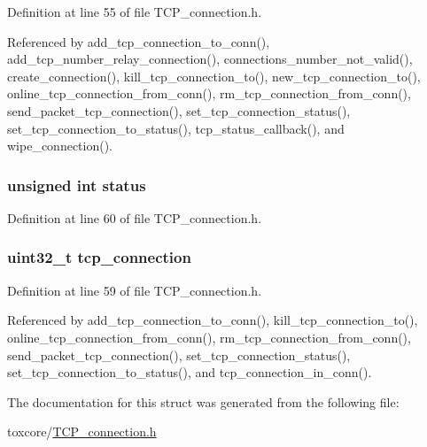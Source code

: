 Definition at line 55 of file T\+C\+P\+\_\+connection.\+h.



Referenced by add\+\_\+tcp\+\_\+connection\+\_\+to\+\_\+conn(), add\+\_\+tcp\+\_\+number\+\_\+relay\+\_\+connection(), connections\+\_\+number\+\_\+not\+\_\+valid(), create\+\_\+connection(), kill\+\_\+tcp\+\_\+connection\+\_\+to(), new\+\_\+tcp\+\_\+connection\+\_\+to(), online\+\_\+tcp\+\_\+connection\+\_\+from\+\_\+conn(), rm\+\_\+tcp\+\_\+connection\+\_\+from\+\_\+conn(), send\+\_\+packet\+\_\+tcp\+\_\+connection(), set\+\_\+tcp\+\_\+connection\+\_\+status(), set\+\_\+tcp\+\_\+connection\+\_\+to\+\_\+status(), tcp\+\_\+status\+\_\+callback(), and wipe\+\_\+connection().

\hypertarget{struct_t_c_p___connection__to_aeed08ea57af6f7be240e2bf66162389f}{
\subsubsection[{status}]{\setlength{\rightskip}{0pt plus 5cm}unsigned int status}}\label{struct_t_c_p___connection__to_aeed08ea57af6f7be240e2bf66162389f}


Definition at line 60 of file T\+C\+P\+\_\+connection.\+h.

\hypertarget{struct_t_c_p___connection__to_a36999f2346dd09dd7c3135fe135404ae}{
\subsubsection[{tcp\+\_\+connection}]{\setlength{\rightskip}{0pt plus 5cm}uint32\+\_\+t tcp\+\_\+connection}}\label{struct_t_c_p___connection__to_a36999f2346dd09dd7c3135fe135404ae}


Definition at line 59 of file T\+C\+P\+\_\+connection.\+h.



Referenced by add\+\_\+tcp\+\_\+connection\+\_\+to\+\_\+conn(), kill\+\_\+tcp\+\_\+connection\+\_\+to(), online\+\_\+tcp\+\_\+connection\+\_\+from\+\_\+conn(), rm\+\_\+tcp\+\_\+connection\+\_\+from\+\_\+conn(), send\+\_\+packet\+\_\+tcp\+\_\+connection(), set\+\_\+tcp\+\_\+connection\+\_\+status(), set\+\_\+tcp\+\_\+connection\+\_\+to\+\_\+status(), and tcp\+\_\+connection\+\_\+in\+\_\+conn().



The documentation for this struct was generated from the following file\+:\begin{DoxyCompactItemize}
\item 
toxcore/\hyperlink{_t_c_p__connection_8h}{T\+C\+P\+\_\+connection.\+h}\end{DoxyCompactItemize}
